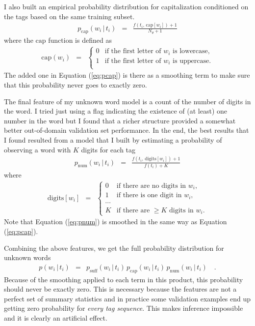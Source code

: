 \documentclass[11pt]{article}
\newcommand{\eq}[1]{Equation (\ref{eq:#1})}
\newcommand{\eqlabel}[1]{\label{eq:#1}}
\begin{document}
I also built an empirical probability distribution for capitalization
conditioned on the tags based on the same training subset.
\begin{eqnarray}\eqlabel{pcap}
p_\mathrm{cap} (w_i\,|\,t_i) &=&
    \frac{f(t_i,\,\mathrm{cap}[w_i])+1}{N_\theta+1}
\end{eqnarray}
where the $\mathrm{cap}$ function is defined as
\begin{eqnarray}
\mathrm{cap}(w_i) &=& \left \{ \begin{array}{ll}
    0 & \mbox{if the first letter of $w_i$ is lowercase,} \\
    1 & \mbox{if the first letter of $w_i$ is uppercase.} \\
\end{array}\right .
\end{eqnarray}
The added one in \eq{pcap} is there as a smoothing term to make sure that this
probability never goes to exactly zero.

The final feature of my unknown word model is a count of the number of digits
in the word.
I tried just using a flag indicating the existence of (at least) one number in
the word but I found that a richer structure provided a somewhat better
out-of-domain validation set performance.
In the end, the best results that I found resulted from a model that I built
by estimating a probability of observing a word with $K$ digits for each tag
\begin{eqnarray}\eqlabel{pnum}
p_\mathrm{num}(w_i\,|\,t_i) &=&
    \frac{f(t_i,\,\mathrm{digits}[w_i])+1}{f(t_i)+K}
\end{eqnarray}
where
\begin{eqnarray}
\mathrm{digits}[w_i] &=& \left \{ \begin{array}{ll}
    0 & \mbox{if there are no digits in $w_i$,} \\
    1 & \mbox{if there is one digit in $w_i$,} \\
    \cdots & \\
    K & \mbox{if there are $\ge K$ digits in $w_i$.}
\end{array}\right.
\end{eqnarray}
Note that \eq{pnum} is smoothed in the same way as \eq{pcap}.

Combining the above features, we get the full probability distribution for
unknown words
\begin{eqnarray}\eqlabel{pfull}
p(w_i\,|\,t_i) &=& p_\mathrm{suff}(w_i\,|\,t_i) \,
                   p_\mathrm{cap}(w_i\,|\,t_i) \,
                   p_\mathrm{num}(w_i\,|\,t_i) \quad.
\end{eqnarray}
Because of the smoothing applied to each term in this product, this
probability should never be exactly zero.
This is necessary because the features are not a perfect set of summary
statistics and in practice some validation examples end up getting zero
probability for \emph{every tag sequence}.
This makes inference impossible and it is clearly an artificial effect.
\end{document}
